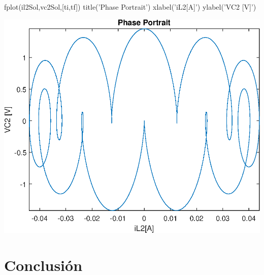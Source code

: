 \documentclass[10pt,a4paper]{article} %
\begin{document}
\begin{matlabcode}
	fplot(il2Sol,vc2Sol,[ti,tf])
	title('Phase Portrait')
	xlabel('iL2[A]')
	ylabel('VC2 [V]')
\end{matlabcode}
\begin{center}
	\includegraphics[width=\maxwidth{56.196688409433015em}]{figure_3_10}
\end{center}
\newpage
	\section{Conclusión}
	
	
	
\end{document}
